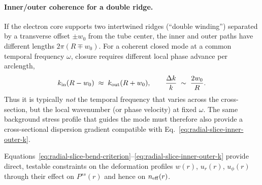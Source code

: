 \paragraph{Inner/outer coherence for a double ridge.}
If the electron core supports two intertwined ridges (``double winding'') separated by a transverse
offset $\pm w_0$ from the tube center, the inner and outer paths have different lengths
$2\pi(R\mp w_0)$. For a coherent closed mode at a common temporal frequency $\omega$, closure requires
different local phase advance per arclength,
\begin{equation}
k_{\rm in}(R-w_0)\;\approx\;k_{\rm out}(R+w_0),
\qquad
\frac{\Delta k}{k}\;\sim\;\frac{2w_0}{R}.
\label{eq:radial-slice-inner-outer-k}
\end{equation}
Thus it is typically \emph{not} the temporal frequency that varies across the cross-section, but the
local wavenumber (or phase velocity) at fixed $\omega$.
The same background stress profile that guides the mode must therefore also provide a cross-sectional
dispersion gradient compatible with Eq.~\eqref{eq:radial-slice-inner-outer-k}.

Equations~\eqref{eq:radial-slice-bend-criterion}--\eqref{eq:radial-slice-inner-outer-k} provide
direct, testable constraints on the deformation profiles $w(r)$, $u_r(r)$, $u_\phi(r)$ through their
effect on $P^{ss}(r)$ and hence on $n_{\rm eff}(r)$.
